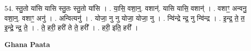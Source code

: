 \documentclass[17pt]{extarticle}
\begin{document}
54. स्तु॒तो या॑सि यासि स्तु॒तः स्तु॒तो या॑सि । . या॒सि॒ वशा॒न्॒. वशान्॑. यासि यासि॒ वशान्॑ । . वशाꣳ॒॒ अन्वनु॒ वशा॒न्॒. वशाꣳ॒॒ अनु॑ । . अन्वित्यनु॑ । . योजा॒ नु नु योजा॒ योजा॒ नु । . न्वि॑न्द्रे न्द्र॒ नु न्वि॑न्द्र । . इ॒न्द्र॒ ते॒ त॒ इ॒न्द्रे॒ न्द्र॒ ते॒ । . ते॒ हरी॒ हरी॑ ते ते॒ हरी᳚ । . हरी॒ इति॒ हरी᳚ । \newline

\textbf{Ghana Paata } \newline
\end{document}
